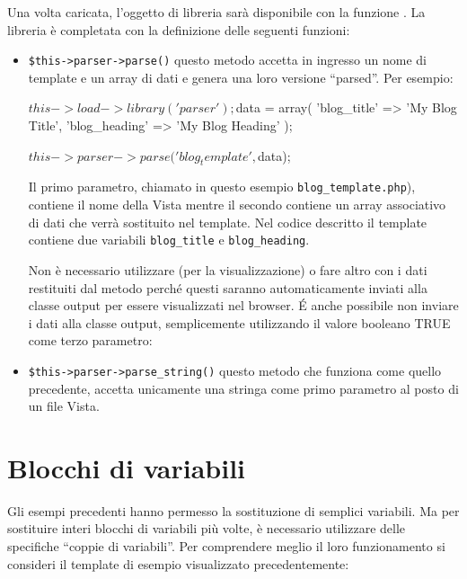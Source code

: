Una volta caricata, l'oggetto di libreria sarà disponibile con la funzione . La libreria è completata con la definizione delle seguenti funzioni:

\begin{itemize}
\item \verb|$this->parser->parse()| questo metodo accetta in ingresso un nome di template e un array di dati e genera una loro versione ``parsed''. Per esempio:

\begin{code}
$this->load->library('parser');

$data = array(
            'blog_title' => 'My Blog Title',
            'blog_heading' => 'My Blog Heading'
            );

$this->parser->parse('blog_template', $data);
\end{code}

Il primo parametro, chiamato in questo esempio \verb|blog_template.php|), contiene il nome della Vista mentre il secondo contiene un array associativo di dati che verrà sostituito nel template. Nel codice descritto il template contiene due variabili \verb|blog_title| e \verb|blog_heading|.

Non è necessario utilizzare  (per la visualizzazione) o fare altro con i dati restituiti dal metodo  perché questi saranno automaticamente inviati alla classe output per essere visualizzati nel browser. \'E anche possibile non inviare i dati alla classe output, semplicemente utilizzando il valore booleano TRUE come terzo parametro:


\item \verb|$this->parser->parse_string()| questo metodo che funziona come quello precedente, accetta unicamente una stringa come primo parametro al posto di un file Vista.
\end{itemize}

\section*{Blocchi di variabili}

Gli esempi precedenti hanno permesso la sostituzione di semplici variabili. Ma per sostituire interi blocchi di variabili più volte, è necessario utilizzare delle specifiche ``coppie di variabili''. Per comprendere meglio il loro funzionamento si consideri il template di esempio visualizzato precedentemente:


